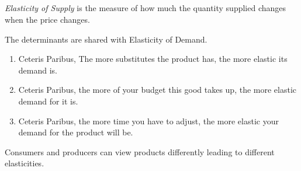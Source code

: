 \subsection{}

\begin{definition}
    \emph{Elasticity of Supply} is the measure of how much the quantity supplied changes when the price changes.
\end{definition}
The determinants are shared with Elasticity of Demand.
\begin{enumerate}
    \item Ceteris Paribus, The more substitutes the product has, the more elastic its demand is.
    \item Ceteris Paribus, the more of your budget this good takes up, the more elastic demand for it is.
    \item Ceteris Paribus, the more time you have to adjust, the more elastic your demand for the product will be.
\end{enumerate}
Consumers and producers can view products differently leading to different elasticities.\\